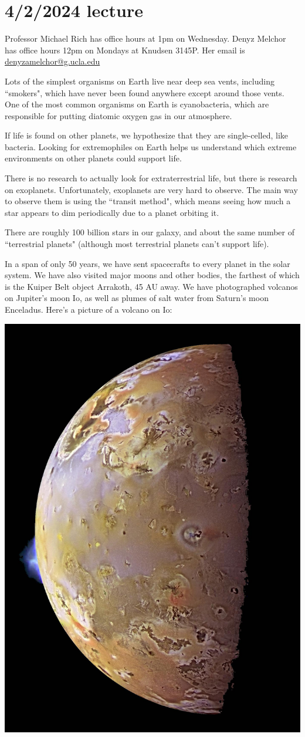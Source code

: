 \documentclass[class=article, crop=false]{standalone}
\begin{document}
\section{4/2/2024 lecture}

Professor Michael Rich has office hours at 1pm on Wednesday.
Denyz Melchor has office hours 12pm on Mondays at Knudsen 3145P. Her email is \url{denyzamelchor@g.ucla.edu}
\par
Lots of the simplest organisms on Earth live near deep sea vents, including ``smokers", which have never been found anywhere except around those vents. One of the most common organisms on Earth is cyanobacteria, which are responsible for putting diatomic oxygen gas in our atmosphere.
\par
If life is found on other planets, we hypothesize that they are single-celled, like bacteria. Looking for extremophiles on Earth helps us understand which extreme environments on other planets could support life.
\par
There is no research to actually look for extraterrestrial life, but there is research on exoplanets. Unfortunately, exoplanets are very hard to observe. The main way to observe them is using the ``transit method", which means seeing how much a star appears to dim periodically due to a planet orbiting it.
\par
There are roughly 100 billion stars in our galaxy, and about the same number of ``terrestrial planets" (although most terrestrial planets can't support life).
\par
In a span of only 50 years, we have sent spacecrafts to every planet in the solar system. We have also visited major moons and other bodies, the farthest of which is the Kuiper Belt object Arrakoth, 45 AU away. We have photographed volcanos on Jupiter's moon Io, as well as plumes of salt water from Saturn's moon Enceladus. Here's a picture of a volcano on Io:
\begin{center}
    \includegraphics[width=.5\textwidth]{Io volcanos.jpg}
\end{center}
\end{document}
